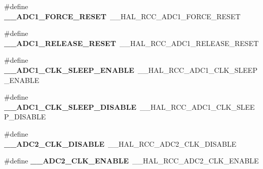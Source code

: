 \begin{DoxyCompactItemize}
\item 
\mbox{\label{group___h_a_l___r_c_c___aliased_ga74c96fb6dcb3e5ac23637040874f742a}} 
\#define {\bfseries \+\_\+\+\_\+\+A\+D\+C1\+\_\+\+F\+O\+R\+C\+E\+\_\+\+R\+E\+S\+ET}~\+\_\+\+\_\+\+H\+A\+L\+\_\+\+R\+C\+C\+\_\+\+A\+D\+C1\+\_\+\+F\+O\+R\+C\+E\+\_\+\+R\+E\+S\+ET
\item 
\mbox{\label{group___h_a_l___r_c_c___aliased_ga58dc5da806adc545da8e62b986f6c4f4}} 
\#define {\bfseries \+\_\+\+\_\+\+A\+D\+C1\+\_\+\+R\+E\+L\+E\+A\+S\+E\+\_\+\+R\+E\+S\+ET}~\+\_\+\+\_\+\+H\+A\+L\+\_\+\+R\+C\+C\+\_\+\+A\+D\+C1\+\_\+\+R\+E\+L\+E\+A\+S\+E\+\_\+\+R\+E\+S\+ET
\item 
\mbox{\label{group___h_a_l___r_c_c___aliased_ga9ce0348811aae0a082ef462e050bdbfa}} 
\#define {\bfseries \+\_\+\+\_\+\+A\+D\+C1\+\_\+\+C\+L\+K\+\_\+\+S\+L\+E\+E\+P\+\_\+\+E\+N\+A\+B\+LE}~\+\_\+\+\_\+\+H\+A\+L\+\_\+\+R\+C\+C\+\_\+\+A\+D\+C1\+\_\+\+C\+L\+K\+\_\+\+S\+L\+E\+E\+P\+\_\+\+E\+N\+A\+B\+LE
\item 
\mbox{\label{group___h_a_l___r_c_c___aliased_gab6f5f7285730b9e581578c27eb407246}} 
\#define {\bfseries \+\_\+\+\_\+\+A\+D\+C1\+\_\+\+C\+L\+K\+\_\+\+S\+L\+E\+E\+P\+\_\+\+D\+I\+S\+A\+B\+LE}~\+\_\+\+\_\+\+H\+A\+L\+\_\+\+R\+C\+C\+\_\+\+A\+D\+C1\+\_\+\+C\+L\+K\+\_\+\+S\+L\+E\+E\+P\+\_\+\+D\+I\+S\+A\+B\+LE
\item 
\mbox{\label{group___h_a_l___r_c_c___aliased_gae27221f87c3db8c7e520cd404e530a49}} 
\#define {\bfseries \+\_\+\+\_\+\+A\+D\+C2\+\_\+\+C\+L\+K\+\_\+\+D\+I\+S\+A\+B\+LE}~\+\_\+\+\_\+\+H\+A\+L\+\_\+\+R\+C\+C\+\_\+\+A\+D\+C2\+\_\+\+C\+L\+K\+\_\+\+D\+I\+S\+A\+B\+LE
\item 
\mbox{\label{group___h_a_l___r_c_c___aliased_ga926fc527f079e5e0b3c57b899d32188c}} 
\#define {\bfseries \+\_\+\+\_\+\+A\+D\+C2\+\_\+\+C\+L\+K\+\_\+\+E\+N\+A\+B\+LE}~\+\_\+\+\_\+\+H\+A\+L\+\_\+\+R\+C\+C\+\_\+\+A\+D\+C2\+\_\+\+C\+L\+K\+\_\+\+E\+N\+A\+B\+LE
\item 
\mbox{\label{group___h_a_l___r_c_c___aliased_ga8fff7cb98695cd6db61d658e07b3f7a0}} 

\end{DoxyCompactItemize}

